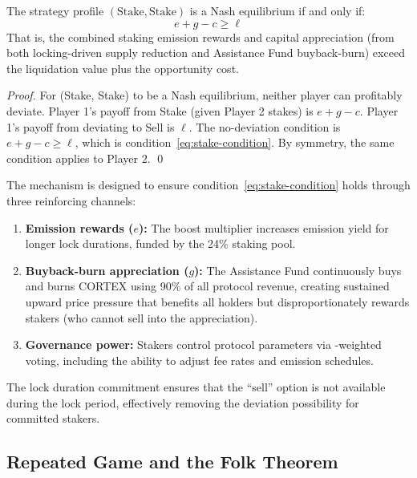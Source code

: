 \begin{proposition}
\label{prop:stake-nash}
The strategy profile $(\text{Stake}, \text{Stake})$ is a Nash equilibrium if
and only if:
\begin{equation}
  e + g - c \geq \ell
  \label{eq:stake-condition}
\end{equation}
That is, the combined staking emission rewards and capital appreciation
(from both locking-driven supply reduction and Assistance Fund buyback-burn)
exceed the liquidation value plus the opportunity cost.
\end{proposition}

\begin{proof}
For (Stake, Stake) to be a Nash equilibrium, neither player can profitably
deviate. Player 1's payoff from Stake (given Player 2 stakes) is $e + g - c$.
Player 1's payoff from deviating to Sell is $\ell$. The no-deviation condition
is $e + g - c \geq \ell$, which is condition~\eqref{eq:stake-condition}.
By symmetry, the same condition applies to Player 2. \qed
\end{proof}

\begin{remark}
The \veCORTEX{} mechanism is designed to ensure condition~\eqref{eq:stake-condition}
holds through three reinforcing channels:
\begin{enumerate}
  \item \textbf{Emission rewards ($e$):} The boost multiplier increases
    emission yield for longer lock durations, funded by the 24\% staking pool.
  \item \textbf{Buyback-burn appreciation ($g$):} The Assistance Fund
    continuously buys and burns CORTEX using 90\% of all protocol revenue,
    creating sustained upward price pressure that benefits all holders but
    disproportionately rewards stakers (who cannot sell into the appreciation).
  \item \textbf{Governance power:} Stakers control protocol parameters via
    \veCORTEX{}-weighted voting, including the ability to adjust fee rates and
    emission schedules.
\end{enumerate}
The lock duration commitment ensures that the ``sell'' option is not available
during the lock period, effectively removing the deviation possibility for
committed stakers.
\end{remark}

\subsection{Repeated Game and the Folk Theorem}
\label{subsec:repeated-game}

